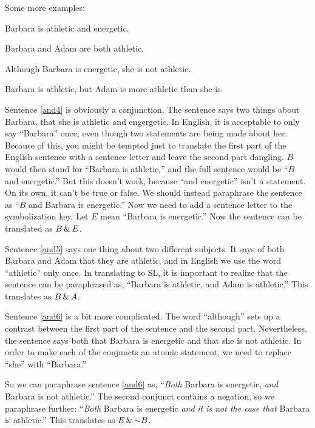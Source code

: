 Some more examples:
\begin{earg}
\item[\ex{and4}]Barbara is athletic and energetic.
\item[\ex{and5}]Barbara and Adam are both athletic.
\item[\ex{and6}]Although Barbara is energetic, she is not athletic.
\item[\ex{and7}]Barbara is athletic, but Adam is more athletic than she is.
\end{earg}

Sentence \ref{and4} is obviously a conjunction. The sentence says two things about Barbara, that she is athletic and engergetic. In English, it is acceptable to only say ``Barbara'' once, even though two statements are being made about her. Because of this, you might be tempted just to translate the first part of the English sentence with a sentence letter and leave the second part dangling.  $B$ would then stand for ``Barbara is athletic,'' and the full sentence would be ``$B$ and energetic.'' But this doesn't work, because ``and energetic'' isn't a statement. On its own, it can't be true or false. We should instead paraphrase the sentence as ``$B$ and Barbara is energetic.'' Now we need to add a sentence letter to the symbolization key. Let $E$ mean ``Barbara is energetic.'' Now the sentence can be translated as $B \,\&\, E$.


Sentence \ref{and5} says one thing about two different subjects. It says of both Barbara and Adam that they are athletic, and in English we use the word ``athletic'' only once. In translating to SL, it is important to realize that the sentence can be paraphrased as, ``Barbara is athletic, and Adam is athletic.'' This translates as $B \,\&\, A$.

Sentence \ref{and6} is a bit more complicated. The word ``although'' sets up a contrast between the first part of the sentence and the second part. Nevertheless, the sentence says both that Barbara is energetic and that she is not athletic. In order to make each of the conjuncts an atomic statement, we need to replace ``she'' with ``Barbara.''

So we can paraphrase sentence \ref{and6} as, ``\emph{Both} Barbara is energetic, \emph{and} Barbara is not athletic.'' The second conjunct contains a negation, so we paraphrase further: ``\emph{Both} Barbara is energetic \emph{and} \emph{it is not the case that} Barbara is athletic.'' This translates as $E \,\&\, \mathord{\sim} B$.

